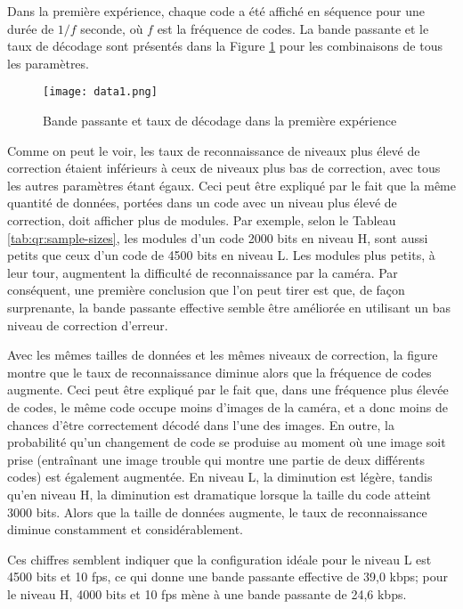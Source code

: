 Dans la première expérience, chaque code a été affiché en séquence pour une durée de $1/f$ seconde, où $f$ est la fréquence de codes. La bande passante et le taux de décodage sont présentés dans la Figure \ref{img-exp1} pour les combinaisons de tous les paramètres.

\begin{figure}
\begin{center}
\centering
\texttt{[image: data1.png]}
\caption{Bande passante et taux de décodage dans la première expérience}
\label{img-exp1}
\end{center}
\end{figure}

Comme on peut le voir, les taux de reconnaissance de niveaux plus élevé de correction étaient inférieurs à ceux de niveaux plus bas de correction, avec tous les autres paramètres étant égaux. Ceci peut être expliqué par le fait que la même quantité de données, portées dans un code avec un niveau plus élevé de correction, doit afficher plus de modules. Par exemple, selon le Tableau \ref{tab:qr:sample-sizes}, les modules d'un code 2000 bits en niveau H, sont aussi petits que ceux d'un code de 4500 bits en niveau L. Les modules plus petits, à leur tour, augmentent la difficulté de reconnaissance par la caméra. Par conséquent, une première conclusion que l'on peut tirer est que, de façon surprenante, la bande passante effective semble être améliorée en utilisant un bas niveau de correction d'erreur.

Avec les mêmes tailles de données et les mêmes niveaux de correction, la figure montre que le taux de reconnaissance diminue alors que la fréquence de codes augmente. Ceci peut être expliqué par le fait que, dans une fréquence plus élevée de codes, le même code occupe moins d'images de la caméra, et a donc moins de chances d'être correctement décodé dans l'une des images. En outre, la probabilité qu'un changement de code se produise au moment où une image soit prise (entraînant une image trouble qui montre une partie de deux différents codes) est également augmentée. En niveau L, la diminution est légère, tandis qu'en niveau H, la diminution est dramatique lorsque la taille du code atteint 3000 bits. Alors que la taille de données augmente, le taux de reconnaissance diminue constamment et considérablement.

Ces chiffres semblent indiquer que la configuration idéale pour le niveau L est 4500 bits et 10 fps, ce qui donne une bande passante effective de 39,0 kbps; pour le niveau H, 4000 bits et 10 fps mène à une bande passante de 24,6 kbps.

